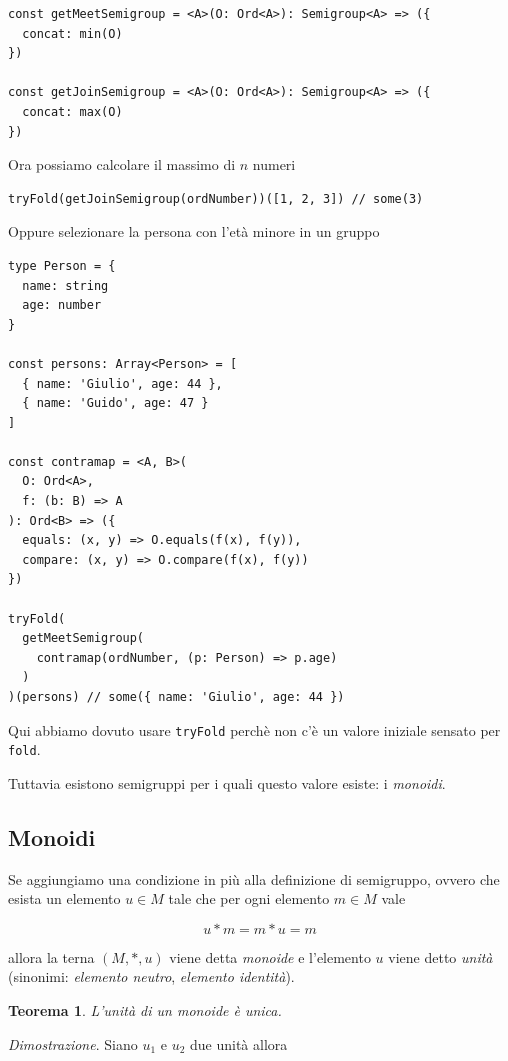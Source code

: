 \documentclass[12pt]{article}
\newtheorem{theorem}{Teorema}
\begin{document}
\begin{verbatim}
const getMeetSemigroup = <A>(O: Ord<A>): Semigroup<A> => ({
  concat: min(O)
})

const getJoinSemigroup = <A>(O: Ord<A>): Semigroup<A> => ({
  concat: max(O)
})
\end{verbatim}

Ora possiamo calcolare il massimo di $n$ numeri

\begin{verbatim}
tryFold(getJoinSemigroup(ordNumber))([1, 2, 3]) // some(3)
\end{verbatim}

Oppure selezionare la persona con l'età minore in un gruppo

\begin{verbatim}
type Person = {
  name: string
  age: number
}

const persons: Array<Person> = [
  { name: 'Giulio', age: 44 },
  { name: 'Guido', age: 47 }
]

const contramap = <A, B>(
  O: Ord<A>,
  f: (b: B) => A
): Ord<B> => ({
  equals: (x, y) => O.equals(f(x), f(y)),
  compare: (x, y) => O.compare(f(x), f(y))
})

tryFold(
  getMeetSemigroup(
    contramap(ordNumber, (p: Person) => p.age)
  )
)(persons) // some({ name: 'Giulio', age: 44 })
\end{verbatim}

Qui abbiamo dovuto usare \texttt{tryFold} perchè non c'è un valore iniziale sensato per \texttt{fold}.

Tuttavia esistono semigruppi per i quali questo valore esiste: i \emph{monoidi}.

\subsection{Monoidi}

Se aggiungiamo una condizione in più alla definizione di semigruppo, ovvero che esista un elemento $u \in M$
tale che per ogni elemento $m \in M$ vale

$$
u * m = m * u = m
$$

allora la terna $(M, *, u)$ viene detta \emph{monoide} e l'elemento $u$ viene detto \emph{unità}
(sinonimi: \emph{elemento neutro}, \emph{elemento identità}).

\begin{theorem}
L'unità di un monoide è unica.
\end{theorem}

\emph{Dimostrazione}. Siano $u_1$ e $u_2$ due unità allora
\end{document}
